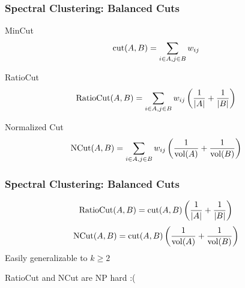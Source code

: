 \documentclass{beamer}
\begin{document}

\begin{frame}
\frametitle{Spectral Clustering: Balanced Cuts}
\vspace{-1.5em}
\begin{flushright}
\end{flushright}
\vspace{-1em}
\pause
\begin{block}{MinCut}
\[{\rm cut}(A,B)= \sum_{i\in A, j\in B} w_{ij}\]
\end{block}

\pause

\begin{block}{RatioCut}
\[{\rm RatioCut}(A,B)= \sum_{i\in A, j\in B} w_{ij} \left( \frac{1}{|A|} + \frac{1}{|B|} \right) \]
\end{block}

\pause


\begin{block}{Normalized Cut}
\[{\rm NCut}(A,B)= \sum_{i\in A, j\in B} w_{ij} \left( \frac{1}{{\rm vol}(A)} + \frac{1}{{\rm vol}(B)} \right) \]
\end{block}

\end{frame}
\begin{frame}
\frametitle{Spectral Clustering: Balanced Cuts}

\[{\rm RatioCut}(A,B)=  {\rm cut}(A,B) \left( \frac{1}{|A|} + \frac{1}{|B|} \right) \]
\[{\rm NCut}(A,B)= {\rm cut}(A,B) \left( \frac{1}{{\rm vol}(A)} + \frac{1}{{\rm vol}(B)} \right) \]
\bigskip
Easily generalizable to $k \geq 2$
\pause
\medskip
\begin{center}
 \pause 
RatioCut and NCut are NP hard :( 
\pause 
\bigskip
\bigskip
{}
\end{center}

\end{frame}
\end{document}
